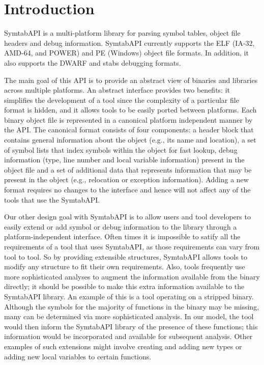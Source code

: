 \section{Introduction}
\label{sec:intro}

SymtabAPI is a multi-platform library for parsing symbol tables,
object file headers and debug information. SymtabAPI currently
supports the ELF (IA-32, AMD-64, and POWER) and PE
(Windows) object file formats. In addition, it also supports the DWARF
and stabs debugging formats.

The main goal of this API is to provide an abstract view of binaries and
libraries across multiple platforms. An abstract interface provides two
benefits: it simplifies the development of a tool since the complexity of a
particular file format is hidden, and it allows tools to be easily ported
between platforms. Each binary object file is represented in a canonical
platform independent manner by the API. The canonical format consists of four
components: a header block that contains general information about the object
(e.g., its name and location), a set of symbol lists that index symbols within
the object for fast lookup, debug information (type, line number and local
variable information) present in the object file and a set of additional data
that represents information that may be present in the object (e.g., relocation
or exception information). Adding a new format requires no changes to the
interface and hence will not affect any of the tools that use the SymtabAPI. 

Our other design goal with SymtabAPI is to allow users and tool developers to
easily extend or add symbol or debug information to the library through a
platform-independent interface. Often times it is impossible to satify all the
requirements of a tool that uses SymtabAPI, as those requirements can vary from
tool to tool. So by providing extensible structures, SymtabAPI allows tools to
modify any structure to fit their own requirements. Also, tools frequently use
more sophisticated analyses to augment the information available from the binary
directly; it should be possible to make this extra information available to the
SymtabAPI library. An example of this is a tool operating on a stripped binary.
Although the symbols for the majority of functions in the binary may be missing,
many can be determined via more sophisticated analysis. In our model, the tool
would then inform the SymtabAPI library of the presence of these functions; this
information would be incorporated and available for subsequent analysis. Other
examples of such extensions might involve creating and adding new types or
adding new local variables to certain functions.
